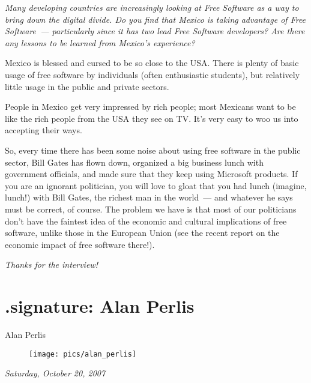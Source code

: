 \documentclass{memoir}
\begin{document}
\bigskip

\emph{Many developing countries are increasingly looking at Free
  Software as a way to bring down the digital divide. Do you find that
  Mexico is taking advantage of Free Software~--- particularly since it
  has two lead Free Software developers? Are there any lessons to be
  learned from Mexico's experience?}

\bigskip

Mexico is blessed and cursed to be so close to the USA. There is
plenty of basic usage of free software by individuals (often
enthusiastic students), but relatively little usage in the public and
private sectors.

People in Mexico get very impressed by rich people; most Mexicans want
to be like the rich people from the USA they see on TV. It's very easy
to woo us into accepting their ways.

So, every time there has been some noise about using free software in
the public sector, Bill Gates has flown down, organized a big business
lunch with government officials, and made sure that they keep using
Microsoft products. If you are an ignorant politician, you will love
to gloat that you had lunch (imagine, lunch!) with Bill Gates, the
richest man in the world~--- and whatever he says must be correct, of
course. The problem we have is that most of our politicians don't have
the faintest idea of the economic and cultural implications of free
software, unlike those in the European Union (see the recent report on
the economic impact of free software there!).

\bigskip

\emph{Thanks for the interview!}

\chapter{.signature: Alan Perlis}

\begin{epigraphs}
      {Alan Perlis}
\end{epigraphs}

\begin{figure}
\begin{center}
\texttt{[image: pics/alan\_perlis]}
\end{center}
\end{figure}

\begin{flushright}
  \emph{Saturday, October 20, 2007}
\end{flushright}
\end{document}
